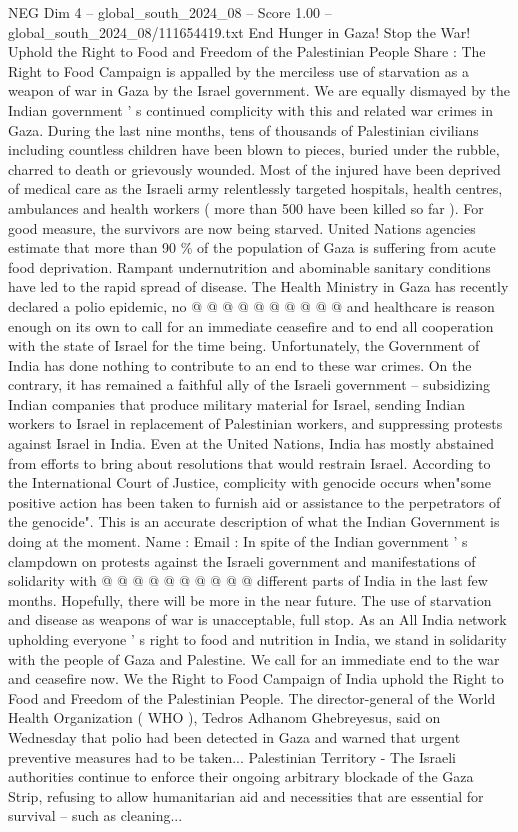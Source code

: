 \begin{textsample}{NEG Dim 4 – global\_south\_2024\_08 – Score 1.00 – global\_south\_2024\_08/111654419.txt}  \label{ex:f4_neg_334}
End Hunger in Gaza!
Stop the War!
Uphold the Right to Food and Freedom of the Palestinian People Share : The Right to Food Campaign is appalled by the merciless use of starvation as a weapon of war in Gaza by the Israel government.
We are equally dismayed by the Indian government ' s continued complicity with this and related war crimes in Gaza.
During the last nine months, tens of thousands of Palestinian civilians including countless children have been blown to pieces, buried under the rubble, charred to death or grievously wounded.
Most of the injured have been deprived of medical care as the Israeli army relentlessly targeted hospitals, health centres, ambulances and health workers ( more than 500 have been killed so far ).
For good measure, the survivors are now being starved.
United Nations agencies estimate that more than 90 \% of the population of Gaza is suffering from acute food deprivation.
Rampant undernutrition and abominable sanitary conditions have led to the rapid spread of disease.
The Health Ministry in Gaza has recently declared a polio epidemic, no @ @ @ @ @ @ @ @ @ @ and healthcare is reason enough on its own to call for an immediate ceasefire and to end all cooperation with the state of Israel for the time being.
Unfortunately, the Government of India has done nothing to contribute to an end to these war crimes.
On the contrary, it has remained a faithful ally of the Israeli government -- subsidizing Indian companies that produce military material for Israel, sending Indian workers to Israel in replacement of Palestinian workers, and suppressing protests against Israel in India.
Even at the United Nations, India has mostly abstained from efforts to bring about resolutions that would restrain Israel.
According to the International Court of Justice, complicity with genocide occurs when"some positive action has been taken to furnish aid or assistance to the perpetrators of the genocide".
This is an accurate description of what the Indian Government is doing at the moment.
Name : Email : In spite of the Indian government ' s clampdown on protests against the Israeli government and manifestations of solidarity with @ @ @ @ @ @ @ @ @ @ different parts of India in the last few months.
Hopefully, there will be more in the near future.
The use of starvation and disease as weapons of war is unacceptable, full stop.
As an All India network upholding everyone ' s right to food and nutrition in India, we stand in solidarity with the people of Gaza and Palestine.
We call for an immediate end to the war and ceasefire now.
We the Right to Food Campaign of India uphold the Right to Food and Freedom of the Palestinian People.
The director-general of the World Health Organization ( WHO ), Tedros Adhanom Ghebreyesus, said on Wednesday that polio had been detected in Gaza and warned that urgent preventive measures had to be taken...
Palestinian Territory - The Israeli authorities continue to enforce their ongoing arbitrary blockade of the Gaza Strip, refusing to allow humanitarian aid and necessities that are essential for survival -- such as cleaning...

\end{textsample}
